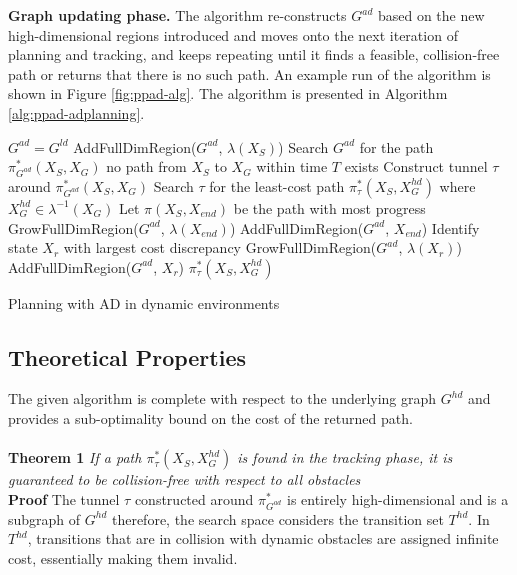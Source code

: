 {\bf Graph updating phase.} The algorithm re-constructs $G^{ad}$ based on the new high-dimensional regions introduced and moves onto the next iteration of planning and tracking, and keeps repeating until it finds a feasible, collision-free path or returns that there is no such path. An example run of the algorithm is shown in Figure \ref{fig:ppad-alg}. The algorithm is presented in Algorithm \ref{alg:ppad-adplanning}.


\begin{algorithm}[h]
\begin{algorithmic}[1]
\State $G^{ad} = G^{ld}$
\State AddFullDimRegion($G^{ad}$, $\lambda(X_S)$)
\Loop
\State Search $G^{ad}$ for the path $\pi_{G^{ad}}^*(X_S, X_G)$
\State \Return no path from $X_S$ to $X_G$ within time $T$ exists
\EndIf
\State Construct tunnel $\tau$ around $\pi_{G^{ad}}^*(X_S, X_G)$
\State Search $\tau$ for the least-cost path $\pi_{\tau}^*(X_S, X_G^{hd})$ where $X_G^{hd} \in \lambda^{-1}(X_G)$
\State Let $\pi(X_S, X_{end})$ be the path with most progress
\State GrowFullDimRegion($G^{ad}$, $\lambda(X_{end})$)
\Else
\State AddFullDimRegion($G^{ad}$, $X_{end}$)
\EndIf
{}
\State Identify state $X_r$ with largest cost discrepancy
\State GrowFullDimRegion($G^{ad}$, $\lambda(X_r)$)
\Else
\State AddFullDimRegion($G^{ad}$, $X_r$)
\EndIf
\Else
\State \Return $\pi_{\tau}^*(X_S, X_G^{hd})$
\EndIf
\EndLoop
\end{algorithmic}
\caption{Planning with AD in dynamic environments}
\label{alg:ppad-adplanning}
\end{algorithm}

\subsection{Theoretical Properties}
\label{sec:ppad-theory}
The given algorithm is complete with respect to the underlying graph $G^{hd}$ and provides a sub-optimality bound on the cost of the returned path. \\ \\
\textbf{Theorem 1} \textit{If a path $\pi_\tau^*(X_S,X_G^{hd})$ is found in the tracking phase, it is guaranteed to be collision-free with respect to all obstacles} \\
\textbf{Proof} The tunnel $\tau$ constructed around $\pi_{G^{ad}}^*$ is entirely high-dimensional and is a subgraph of $G^{hd}$ therefore, the search space considers the transition set $T^{hd}$. In $T^{hd}$, transitions that are in collision with dynamic obstacles are assigned infinite cost, essentially making them invalid.


